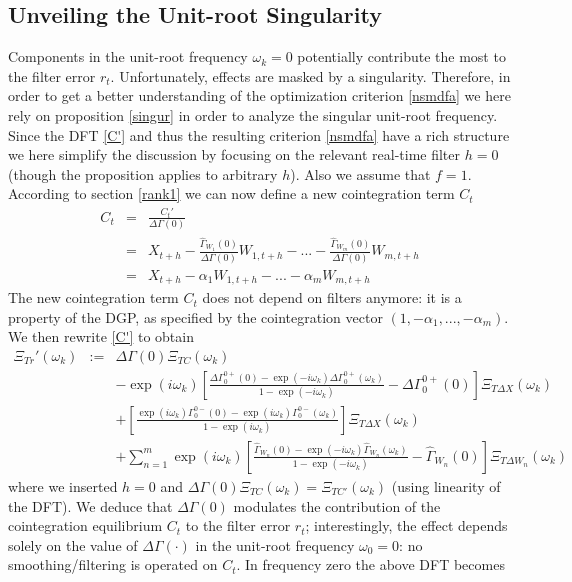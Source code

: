 \documentclass[11pt]{article}
\begin{document}
\subsection{ Unveiling the Unit-root Singularity} \label{discussion}



Components in the unit-root frequency $\omega_k=0$ potentially contribute the most to the filter error $r_t$. Unfortunately, effects are  masked by a singularity. Therefore, in order to get a better understanding of the optimization criterion \ref{nsmdfa} we here rely on proposition \ref{singur} in order to analyze the singular unit-root frequency. Since the DFT \ref{C'} and thus the resulting criterion \ref{nsmdfa} have a rich structure we here simplify the discussion by focusing on the relevant real-time filter $h=0$ (though the proposition  applies to arbitrary $h$). Also we assume that $f=1$. According to section \ref{rank1} we can now define a new cointegration term $C_t$
\begin{eqnarray}
C_t&=&\frac{C_t'}{\Delta \Gamma(0)}\nonumber\\
&=&X_{t+h}-\frac{\hat{\Gamma}_{W_1}(0)}{\Delta \Gamma(0)}W_{1,t+h}-...-\frac{\hat{\Gamma}_{W_m}(0)}{\Delta \Gamma(0)}W_{m,t+h}\nonumber\\
&=&X_{t+h}-\alpha_{1}W_{1,t+h}-...-\alpha_{m}W_{m,t+h}\nonumber
\end{eqnarray}
The new cointegration term $C_t$ does not depend on filters anymore: it is a property of the DGP, as specified by the cointegration vector $(1,-\alpha_1,...,-\alpha_m)$.  We then rewrite \ref{C'} to obtain
\begin{eqnarray}
\Xi_{Tr}'(\omega_k)&:=& \Delta\Gamma(0)\Xi_{TC}(\omega_k)\label{C'''}\\
&&-\exp(i\omega_k)\left[\frac{\Delta\Gamma_{0}^{0+}(0)-\exp(-i\omega_k)\Delta\Gamma_{0}^{0+}(\omega_k)}{1-\exp(-i\omega_k)}-\Delta\Gamma_{0}^{0+}(0)\right]\Xi_{T\Delta X}(\omega_k)\nonumber\\
&&+\left[\frac{\exp(i\omega_k)\Gamma_{0}^{0-}(0)-\exp(i\omega_k)\Gamma_{0}^{0-}(\omega_k)}{1-\exp(i\omega_k)}\right]\Xi_{T\Delta X}(\omega_k)\nonumber\\
&&+\sum_{n=1}^m\exp(i\omega_k)\left[\frac{\hat{\Gamma}_{W_n}(0)-\exp(-i\omega_k)\hat{\Gamma}_{W_n}(\omega_k)}{1-\exp(-i\omega_k)}-\hat{\Gamma}_{W_n}(0)\right]\Xi_{T\Delta W_n}(\omega_k)\nonumber
\end{eqnarray} 
where we inserted $h=0$ and $\Delta\Gamma(0)\Xi_{TC}(\omega_k)=\Xi_{TC'}(\omega_k)$ (using linearity of the DFT). We deduce that $ \Delta\Gamma(0)$ modulates the contribution of the cointegration equilibrium $C_t$ to the filter error $r_t$; interestingly, the effect depends solely on the value of $\Delta\Gamma(\cdot)$ in the unit-root frequency $\omega_0=0$: no smoothing/filtering is operated on $C_t$.  In frequency zero the above DFT becomes
\end{document}

